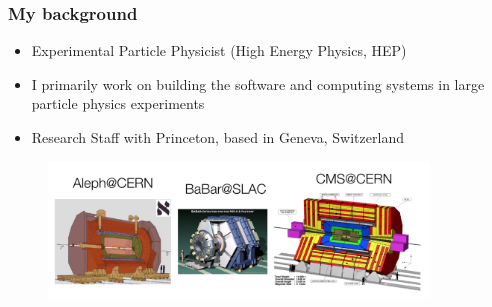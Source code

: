\begin{frame}
\frametitle{My background}

\begin{itemize}
\item Experimental Particle Physicist (High Energy Physics, HEP)
\item I primarily work on building the software and computing systems in large particle physics experiments
\item Research Staff with Princeton, based in Geneva, Switzerland
\end{itemize}

\begin{figure}[htbp]
\begin{center}
\includegraphics[width=0.9\textwidth]{images/aleph-babar-cms-experiments.png}
\end{center}
\end{figure}


\end{frame}


